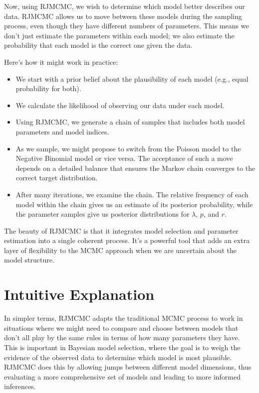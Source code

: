 \documentclass[10pt]{article}
\begin{document}
Now, using RJMCMC, we wish to determine which model better describes our data. RJMCMC allows us to move between these models during the sampling process, even though they have different numbers of parameters. This means we don't just estimate the parameters within each model; we also estimate the probability that each model is the correct one given the data.

Here's how it might work in practice:

\begin{itemize}
  \item We start with a prior belief about the plausibility of each model (e.g., equal probability for both).
  \item We calculate the likelihood of observing our data under each model.
  \item Using RJMCMC, we generate a chain of samples that includes both model parameters and model indices.
  \item As we sample, we might propose to switch from the Poisson model to the Negative Binomial model or vice versa. The acceptance of such a move depends on a detailed balance that ensures the Markov chain converges to the correct target distribution.
  \item After many iterations, we examine the chain. The relative frequency of each model within the chain gives us an estimate of its posterior probability, while the parameter samples give us posterior distributions for \( \lambda \), \( p \), and \( r \).
\end{itemize}

The beauty of RJMCMC is that it integrates model selection and parameter estimation into a single coherent process. It's a powerful tool that adds an extra layer of flexibility to the MCMC approach when we are uncertain about the model structure.

\section*{Intuitive Explanation}
In simpler terms, RJMCMC adapts the traditional MCMC process to work in situations where we might need to compare and choose between models that don't all play by the same rules in terms of how many parameters they have. This is important in Bayesian model selection, where the goal is to weigh the evidence of the observed data to determine which model is most plausible. RJMCMC does this by allowing jumps between different model dimensions, thus evaluating a more comprehensive set of models and leading to more informed inferences.
\end{document}
